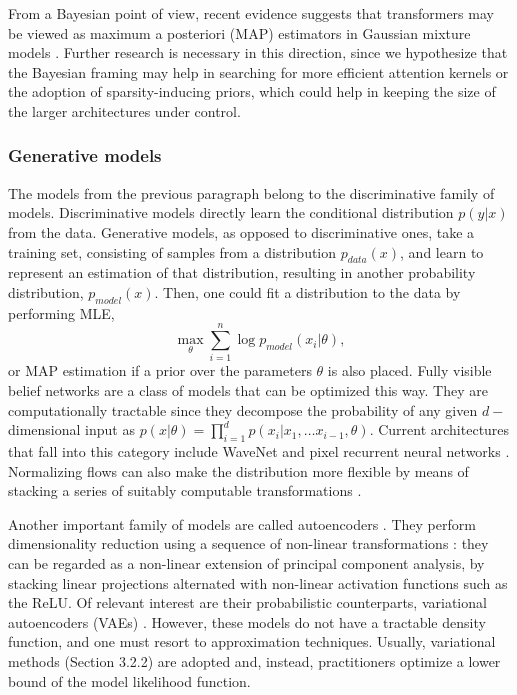 From a Bayesian point of view, recent evidence suggests that transformers may be viewed as maximum 
a posteriori (MAP) estimators in 
 Gaussian mixture models \cite{movellan2020probabilistic}. Further research is necessary in this direction, since we hypothesize that the Bayesian framing may help in searching for more efficient attention kernels or the adoption of sparsity-inducing priors, which could help in keeping the size of the larger architectures under control.


\subsubsection{Generative models} 
The models from the previous paragraph belong to the discriminative family of models. Discriminative models directly learn the conditional distribution $p(y|x)$ from the data.
Generative models, as opposed to discriminative ones, take a training set, consisting of samples from a distribution $p_{data}(x)$, and learn to represent an estimation of that distribution, resulting in another probability distribution, $p_{model}(x)$. Then, one could fit a distribution to the data by performing MLE,
$$
\max_{\theta} \sum_{i=1}^n \log p_{model} (x_i | \theta),
$$
or MAP estimation if a prior over the parameters $\theta$ is also placed. Fully visible belief networks \cite{10.5555/2998828.2998922} are a class of models that can be optimized this way. They are computationally tractable since they decompose the probability of any given $d-$dimensional input as $p(x | \theta) = \prod_{i=1}^d p(x_i | x_1 , \ldots x_{i-1}, \theta)$. Current architectures that fall into this category include WaveNet \cite{oord2016wavenet} and pixel recurrent neural networks \cite{pmlr-v48-oord16}. Normalizing flows can also make the distribution more flexible by means of stacking a series of suitably computable transformations \cite{pmlr-v37-rezende15}.

Another important family of models are called autoencoders \cite{autoencoders}. They perform dimensionality reduction 
using a sequence of non-linear transformations \cite{baldi2012autoencoders}: they can be regarded as a non-linear extension of principal component analysis, by stacking linear projections alternated with non-linear activation functions such as the ReLU. 
Of relevant interest are their probabilistic counterparts, variational autoencoders (VAEs) \cite{kingma2013auto}. However, these models do not have a tractable density function, and one must resort to approximation techniques. Usually, variational methods (Section 3.2.2) are adopted and, instead, practitioners optimize a lower bound of the model likelihood function.

